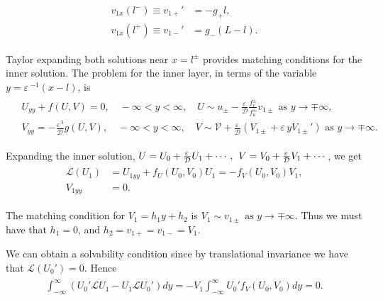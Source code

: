 \documentclass[a4paper,10pt]{article}
\newcommand{\Ep}{\ensuremath{\varepsilon\,}}
\newcommand{\DD}{\ensuremath{\mathcal{D}}}
\newcommand{\VV}{\ensuremath{\mathcal{V}}}
\newcommand{\LL}{\ensuremath{\mathcal{L}}}
\begin{document}
% 
\begin{equation}
\label{eqn:matching_inner}
\begin{split}
\begin{aligned}
	v_{1x}(l^-)\equiv v_{1+}' &= -g_+l,\\
	v_{1x}(l^+)\equiv v_{1-}' &= g_-(L-l).
\end{aligned}
\end{split}
\end{equation}
%

Taylor expanding both solutions near $x=l^{\pm}$ provides matching conditions for the inner solution. The problem for the inner layer, in terms of the variable $y=\Ep^{-1}(x-l)$, is
% 
\begin{equation*}
\begin{split}
\begin{aligned}
	&U_{yy}+f(U,V)=0,\quad -\infty<y<\infty,\quad U\sim u_{\pm}-\frac{\Ep}{\DD}\frac{f_v^{\pm}}{f_u^{\pm}}v_{1\pm}\text{ as }y\rightarrow\mp\infty ,\\
	&V_{yy}=-\frac{\Ep^3}{\DD}g(U,V),\quad -\infty<y<\infty,\quad V\sim \VV+\frac{\Ep}{\DD}(V_{1\pm}+\Ep yV_{1\pm}') \text{ as }y\rightarrow\mp\infty.
\end{aligned}
\end{split}
\end{equation*}
%

Expanding the inner solution, $U = U_0 + \frac{\Ep}{\DD}U_1 + \cdots,\hspace{1ex} V = V_0 + \frac{\Ep}{\DD}V_1 + \cdots$, we get
% 
\begin{equation*}
\begin{split}
\begin{aligned}
	\LL(U_1) &= U_{1yy}+f_U(U_0,V_0)U_1=-f_V(U_0,V_0)V_1,\\
	V_{1yy} &= 0.
\end{aligned}
\end{split}
\end{equation*}
%

The matching condition for $V_1 = h_1y+h_2$ is $V_1\sim v_{1\pm}\text{ as }y\rightarrow\mp\infty$. Thus we must have that $h_1=0$, and $h_2 = v_{1+} = v_{1-} = V_1$.

We can obtain a solvability condition since by translational invariance we have that $\LL(U_0') = 0$. Hence
% 
\begin{equation*}
\begin{split}
\begin{aligned}
	\int_{-\infty}^{\infty}(U_0'\LL U_1 - U_1\LL U_0')dy = -V_1\int_{-\infty}^{\infty}U_0'f_V(U_0,V_0)dy = 0.
\end{aligned}
\end{split}
\end{equation*}
%
\end{document}
